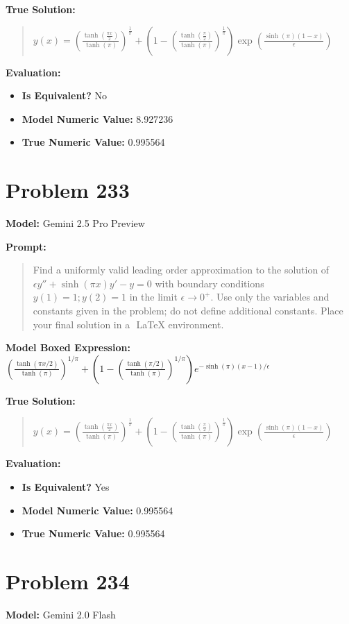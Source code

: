 \documentclass{article}
\begin{document}
{\textbf{True Solution:}
\begin{quote}
$y(x)=(\frac{\tanh(\frac{\pi x}{2})}{\tanh(\pi)})^{\frac{1}{\pi}} + (1 - (\frac{\tanh(\frac{\pi}{2})}{\tanh(\pi)})^{\frac{1}{\pi}}) \exp(\frac{\sinh(\pi)(1-x)}{\epsilon})$
\end{quote}

\textbf{Evaluation:}
\begin{itemize}
\item \textbf{Is Equivalent?} No
\item \textbf{Model Numeric Value:} 8.927236
\item \textbf{True Numeric Value:} 0.995564
\end{itemize}
\vspace{1cm}
\section*{Problem 233}
\textbf{Model:} Gemini 2.5 Pro Preview

\textbf{Prompt:}
\begin{quote}
Find a uniformly valid leading order approximation to the solution of $\epsilon y'' + \sinh(\pi x)y' - y = 0$ with boundary conditions $y(1) = 1; y(2) = 1$ in the limit $\epsilon \to 0^+$. Use only the variables and constants given in the problem; do not define additional constants. Place your final solution in a $\boxed{}$ LaTeX environment.
\end{quote}
\textbf{Model Boxed Expression:} $\left(\frac{\tanh(\pi x/2)}{\tanh(\pi)}\right)^{1/\pi} + \left(1 - \left(\frac{\tanh(\pi/2)}{\tanh(\pi)}\right)^{1/\pi}\right) e^{-\sinh(\pi)(x-1)/\epsilon}$

\textbf{True Solution:}
\begin{quote}
$y(x)=(\frac{\tanh(\frac{\pi x}{2})}{\tanh(\pi)})^{\frac{1}{\pi}} + (1 - (\frac{\tanh(\frac{\pi}{2})}{\tanh(\pi)})^{\frac{1}{\pi}}) \exp(\frac{\sinh(\pi)(1-x)}{\epsilon})$
\end{quote}

\textbf{Evaluation:}
\begin{itemize}
\item \textbf{Is Equivalent?} Yes
\item \textbf{Model Numeric Value:} 0.995564
\item \textbf{True Numeric Value:} 0.995564
\end{itemize}
\vspace{1cm}
\section*{Problem 234}
\textbf{Model:} Gemini 2.0 Flash

}
\end{document}
